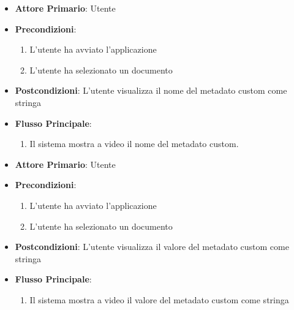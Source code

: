 \begin{itemize}
      \item \textbf{Attore Primario}: Utente
      \item \textbf{Precondizioni}: \begin{enumerate}
      \item L'utente ha avviato l'applicazione
      \item L'utente ha selezionato un documento
      \end{enumerate}
      \item \textbf{Postcondizioni}: L'utente visualizza il nome del metadato custom come stringa
      \item \textbf{Flusso Principale}:
            \begin{enumerate}
                  \item Il sistema mostra a video il nome del metadato custom.
            \end{enumerate}
\end{itemize}

\begin{itemize}
    \item \textbf{Attore Primario}: Utente
        \item \textbf{Precondizioni}:
        \begin{enumerate}
            \item L'utente ha avviato l'applicazione
            \item L'utente ha selezionato un documento
        \end{enumerate}
        \item \textbf{Postcondizioni}: L'utente visualizza il valore del metadato custom come stringa
        \item \textbf{Flusso Principale}: 
        \begin{enumerate}
            \item Il sistema mostra a video il valore del metadato custom come stringa
        \end{enumerate}
\end{itemize}

